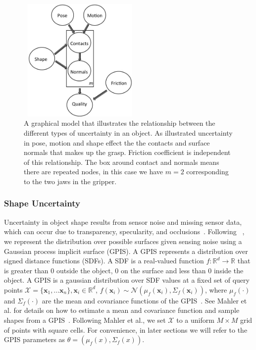 \documentclass[journal,transmag]{IEEEtran}%
\newcommand{\bx}{\mathbf{x}}
\newcommand{\mX}{\mathcal{X}}
\newcommand{\mN}{\mathcal{N}}
\begin{document}
\begin{figure}[ht!]
\centering
\includegraphics[width = 6cm, height = 6cm]{figures/Graphical_Model.jpg}
\caption{A graphical model that illustrates the relationship between the different types of uncertainty in an object. As illustrated uncertainty in pose, motion and shape effect the the contacts and surface normals that makes up the grasp. Friction coefficient is independent of this relationship. The box around contact and normals means there are repeated nodes, in this case we have $m=2$ corresponding to the two jaws in the gripper.  }
\vspace*{-10pt}
\label{fig:graphical_model}
\end{figure}

\subsubsection{Shape Uncertainty}

Uncertainty in object shape results from sensor noise and missing sensor data, which can occur due to transparency, specularity, and occlusions~\cite{mahler2015gp}.
Following ~\cite{mahler2015gp}, we represent the distribution over possible surfaces given sensing noise using a Gaussian process implicit surface (GPIS).
A GPIS represents a distribution over signed distance functions (SDFs).
A SDF is a real-valued function $f: \mathbb{R}^d \rightarrow \mathbb{R}$ that is greater than 0 outside the object, 0 on the surface and less than 0 inside the object.
A GPIS is a gaussian distribution over SDF values at a fixed set of query points $\mX = \{\bx_1, ... \bx_n\}, \bx_i \in \mathbb{R}^d$, $f(\bx_i) \sim \mN(\mu_{f}(\bx_i),\Sigma_{f}(\bx_i))$, where $\mu_{f}(\cdot)$ and $\Sigma_{f}(\cdot)$ are the mean and covariance functions of the GPIS~\cite{rasmussen2006}.
See Mahler et al. for details on how to estimate a mean and covariance function and sample shapes from a GPIS~\cite{mahler2015gp}.
Following Mahler et al., we set $\mX$ to a uniform $M \times M$ grid of points with square cells.
For convenience, in later sections we will refer to the GPIS parameters as $\theta = \left( \mu_{f}(x), \Sigma_{f}(x) \right)$. 
\end{document}
